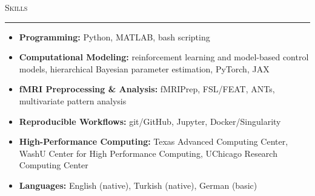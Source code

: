 \documentclass[11pt,letterpaper]{article}
\newif\ifcvafterhead
\newcommand{\cvsection}[1]{%
  \par\vspace{10pt}%
  {\scshape #1}\par\nopagebreak\vspace{-6pt}%
  \noindent\rule{\textwidth}{0.4pt}\par\nopagebreak\vspace{6pt}%
  \global\cvafterheadtrue}
\newenvironment{cvitems}
  {\nopagebreak\vspace{-2pt}\begin{itemize}[leftmargin=1.2em,itemsep=1pt,topsep=0pt,parsep=0pt,label=\textbullet,beginpenalty=10000]}
  {\end{itemize}\vspace{5pt}}
\begin{document}
\cvsection{Skills}
\begin{cvitems}
  \item \textbf{Programming:} Python, MATLAB, bash scripting
  \item \textbf{Computational Modeling:} reinforcement learning and model-based control models,
    hierarchical Bayesian parameter estimation, PyTorch, JAX
  \item \textbf{fMRI Preprocessing \& Analysis:} fMRIPrep, FSL/FEAT, ANTs, multivariate pattern analysis
  \item \textbf{Reproducible Workflows:} git/GitHub, Jupyter, Docker/Singularity
  \item \textbf{High-Performance Computing:} Texas Advanced Computing Center, WashU Center for
    High Performance Computing, UChicago Research Computing Center
  \item \textbf{Languages:} English (native), Turkish (native), German (basic)
\end{cvitems}
\end{document}
